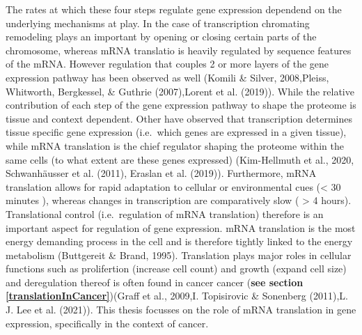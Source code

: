 \documentclass[12pt,openany]{book}
\begin{document}
The rates at which these four steps regulate gene expression dependend
on the underlying mechanisms at play. In the case of transcription
chromating remodeling plays an important by opening or closing certain
parts of the chromosome, whereas mRNA translatio is heavily regulated by
sequence features of the mRNA. However regulation that couples 2 or more
layers of the gene expression pathway has been observed as well (Komili
\& Silver, 2008,Pleiss, Whitworth, Bergkessel, \& Guthrie (2007),Lorent
et al. (2019)). While the relative contribution of each step of the gene
expression pathway to shape the proteome is tissue and context
dependent. Other have observed that transcription determines tissue
specific gene expression (i.e.~which genes are expressed in a given
tissue), while mRNA translation is the chief regulator shaping the
proteome within the same cells (to what extent are these genes
expressed) (Kim-Hellmuth et al., 2020, Schwanhäusser et al. (2011),
Eraslan et al. (2019)). Furthermore, mRNA translation allows for rapid
adaptation to cellular or environmental cues (\textless{} 30 minutes ),
whereas changes in transcription are comparatively slow ( \textgreater{}
4 hours). Translational control (i.e.~regulation of mRNA translation)
therefore is an important aspect for regulation of gene expression. mRNA
translation is the most energy demanding process in the cell and is
therefore tightly linked to the energy metabolism (Buttgereit \& Brand,
1995). Translation plays major roles in cellular functions such as
prolifertion (increase cell count) and growth (expand cell size) and
deregulation thereof is often found in cancer cancer (\textbf{see
section \ref{translationInCancer}})(Graff et al., 2009,I. Topisirovic \&
Sonenberg (2011),L. J. Lee et al. (2021)). This thesis focusses on the
role of mRNA translation in gene expression, specifically in the context
of cancer. \clearpage
\end{document}
